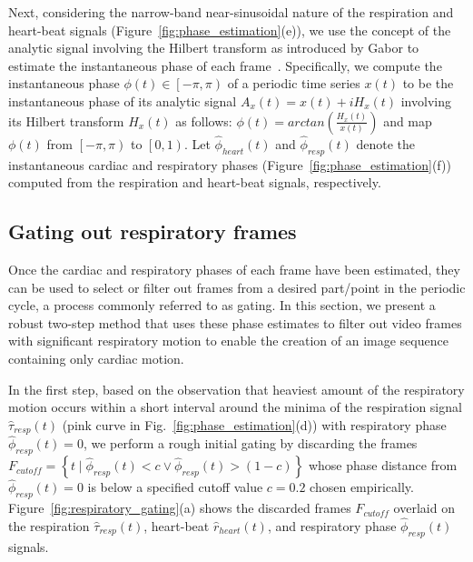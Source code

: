 \documentclass[journal]{IEEEtran}
\begin{document}
Next, considering the narrow-band near-sinusoidal nature of the respiration and heart-beat signals (Figure~\ref{fig:phase_estimation}(e)), we use the concept of the analytic signal involving the Hilbert transform as introduced by Gabor to estimate the instantaneous phase of each frame~\cite{Gabor1946,Bracewell1986,Rosenblum2001,Freund2003,Kuklik2015}. Specifically, we compute the instantaneous phase $\phi(t) \in \left [  -\pi, \pi\right )$ of a periodic time series $x(t)$ to be the instantaneous phase of its analytic signal $A_x(t) = x(t) + i H_x(t)$ involving its Hilbert transform $H_x(t)$ as follows: $\phi(t) = arctan \left( \frac{H_x(t)}{x(t)}\right)$ and map $\phi(t)$ from $\left [  -\pi, \pi\right )$ to $\left [  0, 1\right )$. Let $\hat{\phi}_{heart}(t)$ and $\hat{\phi}_{resp}(t)$ denote the instantaneous cardiac and respiratory phases (Figure~\ref{fig:phase_estimation}(f)) computed from the respiration and heart-beat signals, respectively.
%
\subsection{Gating out respiratory frames}
\label{sec:method:gating}
%
Once the cardiac and respiratory phases of each frame have been estimated, they can be used to select or filter out frames from a desired part/point in the periodic cycle, a process commonly referred to as gating. In this section, we present a robust two-step method that uses these phase estimates to filter out video frames with significant respiratory motion to enable the creation of an image sequence containing only cardiac motion.

In the first step, based on the observation that heaviest amount of the respiratory motion occurs within a short interval around the minima of the respiration signal $\hat{\tau}_{resp}(t)$ (pink curve in Fig.~\ref{fig:phase_estimation}(d)) with respiratory phase $\hat{\phi}_{resp}(t) = 0$, we perform a rough initial gating by discarding the frames $F_{cutoff} = \left \{ t \mid \hat{\phi}_{resp}(t) < c \vee \hat{\phi}_{resp}(t) > (1 - c) \right \}$ whose phase distance from $\hat{\phi}_{resp}(t) = 0$ is below a specified cutoff value $c=0.2$ chosen empirically. Figure~\ref{fig:respiratory_gating}(a) shows the discarded frames $F_{cutoff}$ overlaid on the respiration $\hat{\tau}_{resp}(t)$, heart-beat  $\hat{r}_{heart}(t)$, and respiratory phase $\hat{\phi}_{resp}(t)$ signals.
\end{document}
